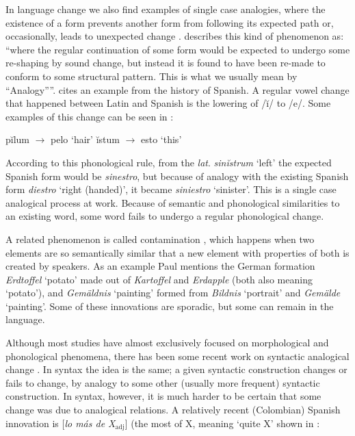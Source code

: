 In language change we also find examples of single case analogies, where the existence of a form prevents another form from following its expected path or, occasionally, leads to unexpected change \autocite{Bauer.2003}. \textcite[276]{Anderson.2015} describes this kind of phenomenon as: ``where the regular continuation of some form would be expected to undergo some re-shaping by sound change, but instead it is found to have been re-made to conform to some structural pattern. This is what we usually mean by ``Analogy''''. \textcite{Rainer.2013} cites an example from the history of Spanish. A regular vowel change that happened between Latin and Spanish is the lowering of /ĭ/ to /e/. Some examples of this change can be seen in :


\begin{exe}
    \ex \label{exe-change-lat}
    \begin{xlist}
        \ex pĭlum $\rightarrow$ pelo `hair'
        \ex ĭstum $\rightarrow$ esto `this'
    \end{xlist}
\end{exe}

According to this phonological rule, from the \textit{lat}. \textit{sin\emph{ĭ}strum} `left' the expected Spanish form would be \textit{sin\emph{e}stro}, but because of analogy with the existing Spanish form \textit{diestro} `right (handed)', it became \textit{sin\emph{ie}stro} `sinister'. This is a single case analogical process at work. Because of semantic and phonological similarities to an existing word, some word fails to undergo a regular phonological change.

A  related phenomenon is called contamination \autocite[160]{Paul.1995}, which happens when two elements are so semantically similar that a new element with properties of both is created by speakers. As an example Paul mentions the German formation \textit{Erdtoffel} `potato' made out of \textit{Kartoffel} and \textit{Erdapple} (both also meaning `potato'), and \textit{Gemäldnis} `painting' formed from \textit{Bildnis} `portrait' and \textit{Gemälde} `painting'. Some of these innovations are sporadic, but some can remain in the language.

Although most studies have almost exclusively focused on morphological and phonological phenomena, there has been some recent work on syntactic analogical change \autocite{DeSmet.2016}. In syntax the idea is the same; a given syntactic construction changes or fails to change, by analogy to some other (usually more frequent) syntactic construction. In syntax, however, it is much harder to be certain that some change was due to analogical relations. A relatively recent (Colombian) Spanish innovation is [\textit{lo más de X$_{\text{adj}}$}] (the most of X, meaning `quite X' shown in :

